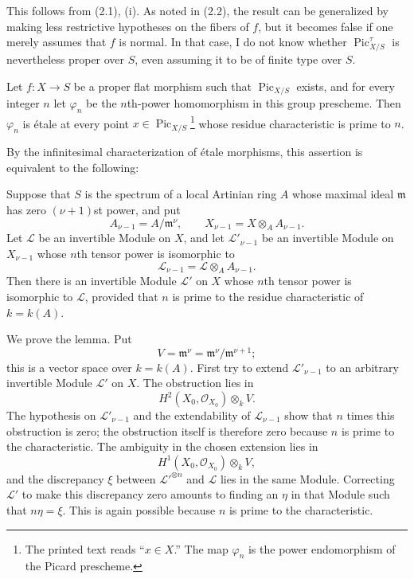 This follows from (2.1), (i). As noted in (2.2), the result can be generalized
by making less restrictive hypotheses on the fibers of $f$, but it becomes
false if one merely assumes that $f$ is normal. In that case, I do not know
whether $\operatorname{Pic}_{X/S}^\tau$ is nevertheless proper over $S$, even
assuming it to be of finite type over $S$.

 Let $f:X\longrightarrow S$ be a proper flat morphism
such that $\operatorname{Pic}_{X/S}$ exists, and for every integer $n$ let
$\varphi_n$ be the $n$th-power homomorphism in this group prescheme. Then
$\varphi_n$ is étale at every point
$x\in\operatorname{Pic}_{X/S}$\footnote{The printed text reads “$x\in X$.”
The map $\varphi_n$ is the power endomorphism of the Picard prescheme.} whose
residue characteristic is prime to $n$.

By the infinitesimal characterization of étale morphisms, this assertion is
equivalent to the following:

 Suppose that $S$ is the spectrum of a local Artinian ring
$A$ whose maximal ideal $\mathfrak m$ has zero $(\nu+1)$st power, and put
\[
A_{\nu-1}=A/\mathfrak m^\nu,
\qquad X_{\nu-1}=X\otimes_A A_{\nu-1}.
\]
Let $\mathcal L$ be an invertible Module on $X$, and let
$\mathcal L'_{\nu-1}$ be an invertible Module on $X_{\nu-1}$ whose $n$th
tensor power is isomorphic to
\[
\mathcal L_{\nu-1}=\mathcal L\otimes_A A_{\nu-1}.
\]
Then there is an invertible Module $\mathcal L'$ on $X$ whose $n$th tensor
power is isomorphic to $\mathcal L$, provided that $n$ is prime to the residue
characteristic of $k=k(A)$.

We prove the lemma. Put
\[
V=\mathfrak m^\nu=\mathfrak m^\nu/\mathfrak m^{\nu+1};
\]
this is a vector space over $k=k(A)$. First try to extend
$\mathcal L'_{\nu-1}$ to an arbitrary invertible Module $\mathcal L'$ on $X$.
The obstruction lies in
\[
H^2(X_0,\mathcal O_{X_0})\otimes_k V.
\]
The hypothesis on $\mathcal L'_{\nu-1}$ and the extendability of
$\mathcal L_{\nu-1}$ show that $n$ times this obstruction is zero; the
obstruction itself is therefore zero because $n$ is prime to the
characteristic. The ambiguity in the chosen extension lies in
\[
H^1(X_0,\mathcal O_{X_0})\otimes_k V,
\]
and the discrepancy $\xi$ between $\mathcal L'^{\otimes n}$ and $\mathcal L$
lies in the same Module. Correcting $\mathcal L'$ to make this discrepancy zero
amounts to finding an $\eta$ in that Module such that $n\eta=\xi$. This is
again possible because $n$ is prime to the characteristic.

